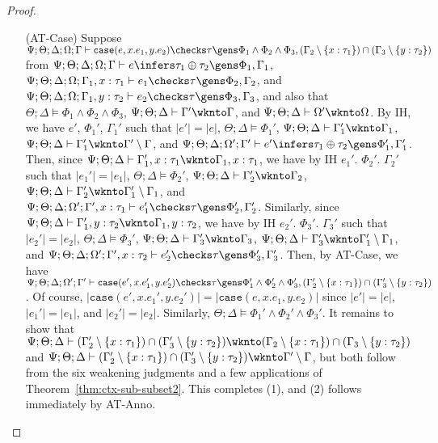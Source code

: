 \begin{proof}
\begin{itemize}
  \item[(AT-Case)] Suppose $\Psi ; \Theta ; \Delta ; \Omega ; \Gamma \vdash \texttt{case}(e,x.e_1,y.e_2) \checks \tau \gens \Phi_1 \wedge \Phi_2 \wedge \Phi_3, (\Gamma_2 \setminus \{x : \tau_1\}) \cap (\Gamma_3 \setminus \{y : \tau_2\})$
  from $\Psi ; \Theta ; \Delta ; \Omega ; \Gamma \vdash e \infers \tau_1 \oplus \tau_2 \gens \Phi_1, \Gamma_1$,
  $\Psi ; \Theta ; \Delta ; \Omega ; \Gamma_1, x: \tau_1 \vdash e_1 \checks \tau \gens \Phi_2,\Gamma_2$, and
  $\Psi ; \Theta ; \Delta ; \Omega ; \Gamma_1, y: \tau_2 \vdash e_2 \checks \tau \gens \Phi_3,\Gamma_3$, and also that
  $\Theta ; \Delta \vDash \Phi_1 \wedge \Phi_2 \wedge \Phi_3$,
  $\Psi ; \Theta ; \Delta \vdash \Gamma' \wknto \Gamma$, and
  $\Psi ; \Theta ; \Delta \vdash \Omega' \wknto \Omega$.
  By IH, we have $e'$, $\Phi_1'$, $\Gamma_1'$ such that
  $|e'| = |e|$,
  $\Theta ; \Delta \vDash \Phi_1'$,
  $\Psi ; \Theta ; \Delta \vdash \Gamma_1' \wknto \Gamma_1$,
  $\Psi ; \Theta ; \Delta \vdash \Gamma_1' \wknto \Gamma' \setminus \Gamma$, and
  $\Psi ; \Theta ; \Delta ; \Omega' ; \Gamma' \vdash e' \infers \tau_1 \oplus \tau_2 \gens \Phi_1',\Gamma_1'$.
  Then, since $\Psi ; \Theta ; \Delta \vdash \Gamma_1', x : \tau_1 \wknto \Gamma_1, x : \tau_1$,
  we have by IH $e_1'$. $\Phi_2'$. $\Gamma_2'$ such that
  $|e_1'| = |e_1|$,
  $\Theta  ; \Delta \vDash \Phi_2'$,
  $\Psi ; \Theta ; \Delta \vdash \Gamma_2' \wknto \Gamma_2$,
  $\Psi ; \Theta ; \Delta \vdash \Gamma_2' \wknto \Gamma_1' \setminus \Gamma_1$, and
  $\Psi ; \Theta ; \Delta ; \Omega' ; \Gamma', x : \tau_1 \vdash e_1' \checks \tau \gens \Phi_2',\Gamma_2'$.
  Similarly, since $\Psi ; \Theta ; \Delta \vdash \Gamma_1', y : \tau_2 \wknto \Gamma_1, y : \tau_2$,
  we have by IH $e_2'$. $\Phi_3'$. $\Gamma_3'$ such that
  $|e_2'| = |e_2|$,
  $\Theta  ; \Delta \vDash \Phi_3'$,
  $\Psi ; \Theta ; \Delta \vdash \Gamma_3' \wknto \Gamma_3$,
  $\Psi ; \Theta ; \Delta \vdash \Gamma_3' \wknto \Gamma_1' \setminus \Gamma_1$, and
  $\Psi ; \Theta ; \Delta ; \Omega' ; \Gamma', x : \tau_2 \vdash e_2' \checks \tau \gens \Phi_3',\Gamma_3'$.
  Then, by AT-Case, we have
  $\Psi ; \Theta ; \Delta ; \Omega' ; \Gamma' \vdash \texttt{case}(e',x.e_1',y.e_2') \checks \tau \gens \Phi_1' \wedge \Phi_2' \wedge \Phi_3', (\Gamma_2' \setminus \{x : \tau_1\}) \cap (\Gamma_3' \setminus \{y : \tau_2\})$.
  Of course, $|\texttt{case}(e',x.e_1',y.e_2')| = |\texttt{case}(e,x.e_1,y.e_2)|$
  since $|e'| = |e|$, $|e_1'| = |e_1|$, and $|e_2'| = |e_2|$.
  Similarly,
  $\Theta ; \Delta \vDash \Phi_1' \wedge \Phi_2' \wedge \Phi_3'$.
  It remains to show that 
  $\Psi ; \Theta ; \Delta \vdash (\Gamma_2' \setminus \{x : \tau_1\}) \cap (\Gamma_3' \setminus \{y : \tau_2\}) \wknto (\Gamma_2 \setminus \{x : \tau_1\}) \cap (\Gamma_3 \setminus \{y : \tau_2\})$
  and
  $\Psi ; \Theta ; \Delta \vdash (\Gamma_2' \setminus \{x : \tau_1\}) \cap (\Gamma_3' \setminus \{y : \tau_2\}) \wknto \Gamma' \setminus \Gamma$,
  but both follow from the six weakening judgments and a few applications of Theorem~\ref{thm:ctx-sub-subset2}.
  This completes (1), and (2) follows immediately by AT-Anno.
  

\end{itemize}
\end{proof}
